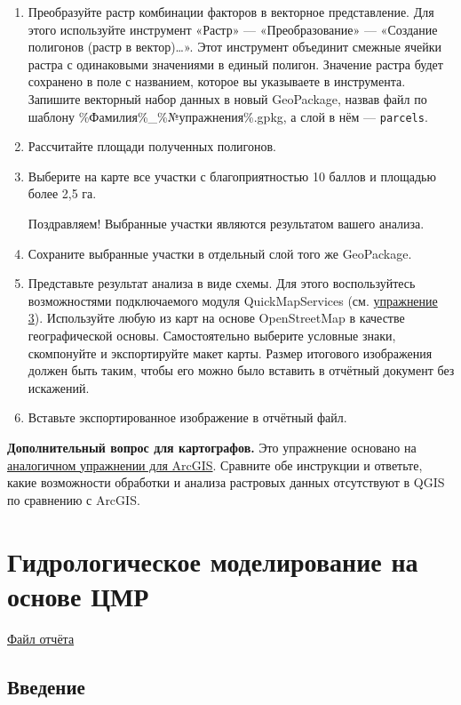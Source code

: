 \documentclass[
  12pt,
]{book}
\begin{document}
\begin{enumerate}
\def\labelenumi{\arabic{enumi}.}
\item
  Преобразуйте растр комбинации факторов в векторное представление. Для этого используйте инструмент «Растр» --- «Преобразование» --- «Создание полигонов (растр в вектор)\ldots». Этот инструмент объединит смежные ячейки растра с одинаковыми значениями в единый полигон. Значение растра будет сохранено в поле с названием, которое вы указываете в инструмента. Запишите векторный набор данных в новый GeoPackage, назвав файл по шаблону \%Фамилия\%\_\%№упражнения\%.gpkg, а слой в нём --- \texttt{parcels}.
\item
  Рассчитайте площади полученных полигонов.
\item
  Выберите на карте все участки с благоприятностью 10 баллов и площадью более 2,5 га.

  Поздравляем! Выбранные участки являются результатом вашего анализа.
\item
  Сохраните выбранные участки в отдельный слой того же GeoPackage.
\item
  Представьте результат анализа в виде схемы. Для этого воспользуйтесь возможностями подключаемого модуля QuickMapServices (см. \protect\hyperlink{map-ref-districts-wms}{упражнение 3}). Используйте любую из карт на основе OpenStreetMap в качестве географической основы. Самостоятельно выберите условные знаки, скомпонуйте и экспортируйте макет карты. Размер итогового изображения должен быть таким, чтобы его можно было вставить в отчётный документ без искажений.
\item
  Вставьте экспортированное изображение в отчётный файл.
\end{enumerate}

\textbf{Дополнительный вопрос для картографов.} Это упражнение основано на \href{https://tsamsonov.github.io/arcgis-course/weighted-overlay.html}{аналогичном упражнении для ArcGIS}. Сравните обе инструкции и ответьте, какие возможности обработки и анализа растровых данных отсутствуют в QGIS по сравнению с ArcGIS.

\hypertarget{hydrodem}{%
\chapter{Гидрологическое моделирование на основе ЦМР}\label{hydrodem}}

\href{https://1drv.ms/u/s!AmtmZDq3JgxHgZUDoyAAULiTkkgkCg?e=DOzWcj}{Файл отчёта}

\hypertarget{hydrodem-intro}{%
\section{Введение}\label{hydrodem-intro}}
\end{document}
